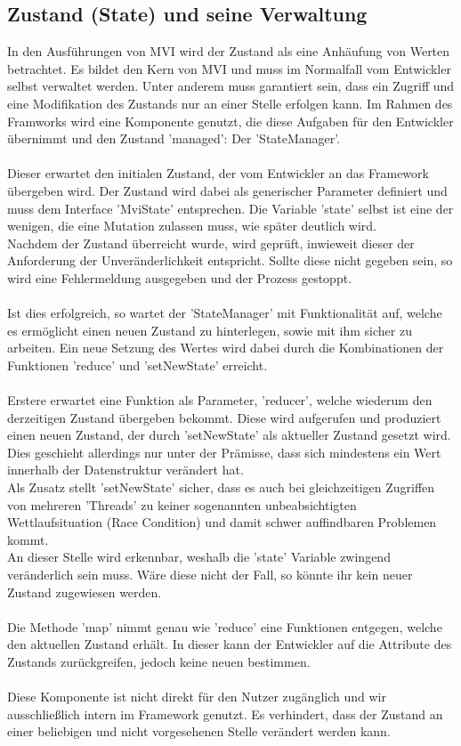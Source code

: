 \subsection{Zustand (State) und seine Verwaltung}
\label{subsec:zustand-und-statemanager}
In den Ausführungen von MVI wird der Zustand als eine Anhäufung von Werten betrachtet. Es bildet den Kern von MVI und muss im Normalfall vom Entwickler selbst verwaltet werden. Unter anderem muss garantiert sein, dass ein Zugriff und eine Modifikation des Zustands nur an einer Stelle erfolgen kann. Im Rahmen des Framworks wird eine Komponente genutzt, die diese Aufgaben für den Entwickler übernimmt und den Zustand 'managed': Der 'StateManager'.
\\\\
Dieser erwartet den initialen Zustand, der vom Entwickler an das Framework übergeben wird. Der Zustand wird dabei als generischer Parameter definiert und muss dem Interface 'MviState' entsprechen. Die Variable 'state' selbst ist eine der wenigen, die eine Mutation zulassen muss, wie später deutlich wird.
\\
Nachdem der Zustand überreicht wurde, wird geprüft, inwieweit dieser der Anforderung der Unveränderlichkeit entspricht. Sollte diese nicht gegeben sein, so wird eine Fehlermeldung ausgegeben und der Prozess gestoppt.
\\\\
Ist dies erfolgreich, so wartet der 'StateManager' mit Funktionalität auf, welche es ermöglicht einen neuen Zustand zu hinterlegen, sowie mit ihm sicher zu arbeiten. Ein neue Setzung des Wertes wird dabei durch die Kombinationen der Funktionen 'reduce' und 'setNewState' erreicht. 
\\\\
Erstere erwartet eine Funktion als Parameter, 'reducer', welche wiederum den derzeitigen Zustand übergeben bekommt. Diese wird aufgerufen und produziert einen neuen Zustand, der durch 'setNewState' als aktueller Zustand gesetzt wird. Dies geschieht allerdings nur unter der Prämisse, dass sich mindestens ein Wert innerhalb der Datenstruktur verändert hat.
\\
Als Zusatz stellt 'setNewState' sicher, dass es auch bei gleichzeitigen Zugriffen von mehreren 'Threads' zu keiner sogenannten unbeabsichtigten Wettlaufsituation (Race Condition) und damit schwer auffindbaren Problemen kommt.
\\
An dieser Stelle wird erkennbar, weshalb die 'state' Variable zwingend veränderlich sein muss. Wäre diese nicht der Fall, so könnte ihr kein neuer Zustand zugewiesen werden.
\\\\
Die Methode 'map' nimmt genau wie 'reduce' eine Funktionen entgegen, welche den aktuellen Zustand erhält. In dieser kann der Entwickler auf die Attribute des Zustands zurückgreifen, jedoch keine neuen bestimmen.
\\\\
Diese Komponente ist nicht direkt für den Nutzer zugänglich und wir ausschließlich intern im Framework genutzt. Es verhindert, dass der Zustand an einer beliebigen und nicht vorgesehenen Stelle verändert werden kann.

